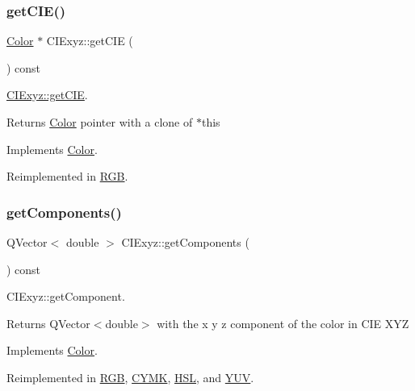 \subsubsection{\texorpdfstring{get\+C\+I\+E()}{getCIE()}}
{\footnotesize\ttfamily \hyperlink{class_color}{Color} $\ast$ C\+I\+Exyz\+::get\+C\+IE (\begin{DoxyParamCaption}{ }\end{DoxyParamCaption}) const\hspace{0.3cm}{\ttfamily [virtual]}}



\hyperlink{class_c_i_exyz_aa93c7a293b63c7bce8d1fab9a185ab1b}{C\+I\+Exyz\+::get\+C\+IE}. 

\begin{DoxyReturn}{Returns}
\hyperlink{class_color}{Color} pointer with a clone of $\ast$this 
\end{DoxyReturn}


Implements \hyperlink{class_color}{Color}.



Reimplemented in \hyperlink{class_r_g_b_ac4b085d5587c664f7f9ceae1eb857d24}{R\+GB}.

\mbox{\label{class_c_i_exyz_af8992e3ac1741c35fcb18aa2cdb554a0}} 
\subsubsection{\texorpdfstring{get\+Components()}{getComponents()}}
{\footnotesize\ttfamily Q\+Vector$<$ double $>$ C\+I\+Exyz\+::get\+Components (\begin{DoxyParamCaption}{ }\end{DoxyParamCaption}) const\hspace{0.3cm}{\ttfamily [virtual]}}



C\+I\+Exyz\+::get\+Component. 

\begin{DoxyReturn}{Returns}
Q\+Vector$<$double$>$ with the x y z component of the color in C\+IE X\+YZ 
\end{DoxyReturn}


Implements \hyperlink{class_color}{Color}.



Reimplemented in \hyperlink{class_r_g_b_ad085d3bd654d874ea2e5739a5c216769}{R\+GB}, \hyperlink{class_c_y_m_k_a46e1058b0332d73710efa5d9f4644ba2}{C\+Y\+MK}, \hyperlink{class_h_s_l_a2de2eb4fa5c9ffcea894f7c6591cb335}{H\+SL}, and \hyperlink{class_y_u_v_ad90109db3486e61e248e274a7690824a}{Y\+UV}.

